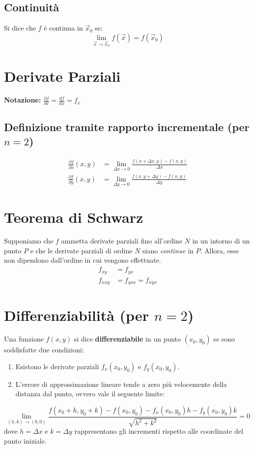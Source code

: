 \subsection{Continuità}
Si dice che $f$ è continua in $\vec{x}_0$ se:
\begin{equation*}
    \lim_{\vec{x} \to \vec{x}_0} f(\vec{x}) = f(\vec{x}_0)
\end{equation*}

\section{Derivate Parziali}
\textbf{Notazione:} $\frac{\partial f}{\partial x} = \frac{df}{dx} = f_x$

\subsection{Definizione tramite rapporto incrementale (per $n=2$)}
\begin{align*}
    \frac{\partial f}{\partial x}(x,y) &= \lim_{\Delta x \to 0} \frac{f(x + \Delta x, y) - f(x, y)}{\Delta x} \\
    \frac{\partial f}{\partial y}(x,y) &= \lim_{\Delta y \to 0} \frac{f(x, y + \Delta y) - f(x, y)}{\Delta y}
\end{align*}

\section{Teorema di Schwarz}
Supponiamo che $f$ ammetta derivate parziali fino all'ordine $N$ in un intorno di un punto $P$ e che le derivate parziali di ordine $N$ siano \textit{continue} in $P$. Allora, esse non dipendono dall'ordine in cui vengono effettuate.
\begin{align*}
    f_{xy} &= f_{yx} \\
    f_{xxy} &= f_{yxx} = f_{xyx}
\end{align*}

\section{Differenziabilità (per $n=2$)}
Una funzione $f(x, y)$ si dice \textbf{differenziabile} in un punto $(x_0, y_0)$ se sono soddisfatte due condizioni:
\begin{enumerate}
    \item Esistono le derivate parziali $f_x(x_0, y_0)$ e $f_y(x_0, y_0)$.
    \item L'errore di approssimazione lineare tende a zero più velocemente della distanza dal punto, ovvero vale il seguente limite:
\end{enumerate}
\begin{equation*}
    \lim_{(h,k) \to (0,0)} \frac{f(x_0+h, y_0+k) - f(x_0, y_0) - f_x(x_0, y_0)h - f_y(x_0, y_0)k}{\sqrt{h^2+k^2}} = 0
\end{equation*}
dove $h = \Delta x$ e $k = \Delta y$ rappresentano gli incrementi rispetto alle coordinate del punto iniziale.

